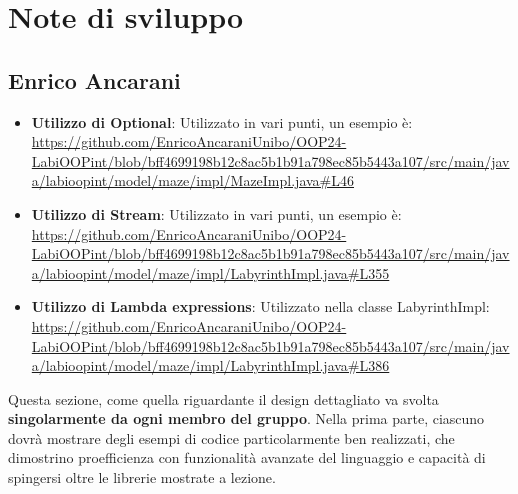 \documentclass[a4paper,12pt]{report}
\begin{document}
\section{Note di sviluppo}

\subsection{Enrico Ancarani}
\begin{itemize}
	\item \textbf{Utilizzo di Optional}: Utilizzato in vari punti, un esempio è: \url{https://github.com/EnricoAncaraniUnibo/OOP24-LabiOOPint/blob/bff4699198b12c8ac5b1b91a798ec85b5443a107/src/main/java/labioopint/model/maze/impl/MazeImpl.java#L46}
	\item \textbf{Utilizzo di Stream}: Utilizzato in vari punti, un esempio è: \url{https://github.com/EnricoAncaraniUnibo/OOP24-LabiOOPint/blob/bff4699198b12c8ac5b1b91a798ec85b5443a107/src/main/java/labioopint/model/maze/impl/LabyrinthImpl.java#L355}
	\item \textbf{Utilizzo di Lambda expressions}: Utilizzato nella classe LabyrinthImpl: \url{https://github.com/EnricoAncaraniUnibo/OOP24-LabiOOPint/blob/bff4699198b12c8ac5b1b91a798ec85b5443a107/src/main/java/labioopint/model/maze/impl/LabyrinthImpl.java#L386}
\end{itemize}

Questa sezione, come quella riguardante il design dettagliato va svolta \textbf{singolarmente da ogni membro del gruppo}.
%
Nella prima parte, ciascuno dovrà mostrare degli esempi di codice particolarmente ben realizzati,
che dimostrino proefficienza con funzionalità avanzate del linguaggio e capacità di spingersi oltre le librerie mostrate a lezione.
\end{document}
